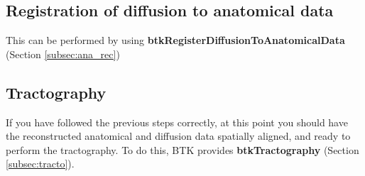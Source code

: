   \begin{figure*}[!htb]
   \caption{Overview of the processing pipeline for diffusion data in BTK. dcm2nii is used to convert the DICOM data to NIFTI format and Slicer for the placement of landmarks on which is based the reorientation of the 3D reconstructed image. ITKSNAP (www.itksnap.org) is used to create a rough mask of the brain.}
   \label{fig:diffusion_pipeline}
 \end{figure*}

  \begin{figure*}[!htb]
   \caption{Command lines corresponding to the processing pipeline for diffusion data in BTK. On the left are shown the blocks used in the anatomical data pipeline (Figure~\ref{fig:diffusion_pipeline}) and on the right the correspond command lines.}
   \label{fig:diffusion_command_line}
 \end{figure*}

\subsection{Registration of diffusion to anatomical data}
This can be performed by using \textbf{btkRegisterDiffusionToAnatomicalData}
(Section \ref{subsec:ana_rec})

\subsection{Tractography}
If you have followed the previous steps correctly, at this point you should
have the reconstructed anatomical and diffusion data spatially aligned, and
ready to perform the tractography. To do this, BTK provides
\textbf{btkTractography} (Section \ref{subsec:tracto}).
